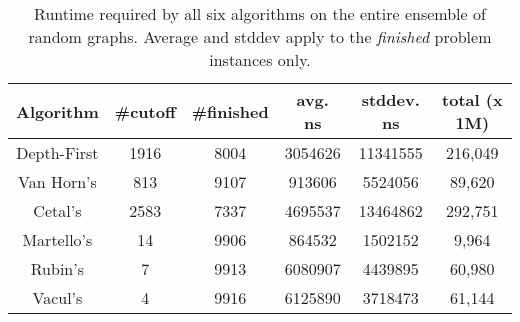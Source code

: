 \begin{table*}[hb]
\small
     \centering
 \begin{tabular}{|c|c|c|c|c|c|}
 \hline
     \rowcolor{increaseblue}\textbf{Algorithm} & \textbf{\#cutoff} & \textbf{\#finished} & \textbf{avg. ns} & \textbf{stddev. ns} & \textbf{total (x 1M)}\\
     \hline
     \hline
      \rowcolor{tablegray}Depth-First & 1916 & 8004 & 3054626 & 11341555 & 216,049 \\
      \rowcolor{tablegray}Van Horn's & 813 & 9107 & 913606 & 5524056 & 89,620\\
      \rowcolor{tablegray}Cetal's & 2583& 7337 &  4695537 & 13464862 & 292,751 \\
      \rowcolor{tablegray}Martello's & 14 & 9906 & 864532 & 1502152 & 9,964 \\
      \rowcolor{tablegray}Rubin's & 7 & 9913 & 6080907 & 4439895 & 60,980 \\
      \rowcolor{tablegray}Vacul's & 4 & 9916 & 6125890 &  3718473 & 61,144  \\
 \hline
 \end{tabular}
 
 \caption{Runtime required by all six algorithms on the entire ensemble of random graphs. Average and stddev apply to the \textit{finished} problem instances only.}
 \label{table:results_time}
\end{table*}



